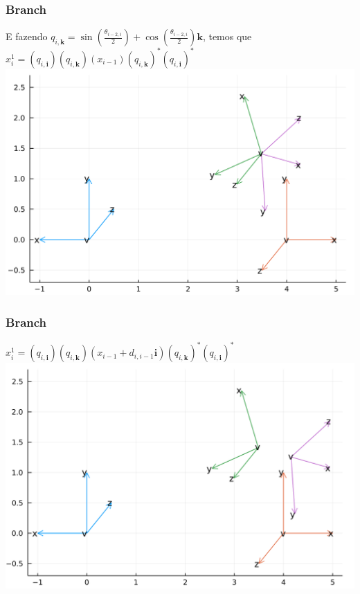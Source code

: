 \documentclass[10pt]{beamer}
\theoremstyle{plain}
\theoremstyle{definition}
\begin{document}
	\begin{frame}
		\frametitle{\normalsize Branch} 
		{
			\begin{center}
				E fazendo $q_{i, \mathbf k} = \sin(\frac {\theta_{i-2, i}} 2) + \cos(\frac {\theta_{i-2, i}} 2)\mathbf k$, temos que\\
				\vspace{0.2cm}
				$x_i^1 = (q_{i,\mathbf i})(q_{i, \mathbf k})(x_{i-1})(q_{i, \mathbf k})^*(q_{i,\mathbf i})^*$
				\\
				
				\vspace{0.5cm}
				\includegraphics[width=0.8\linewidth]{7.png}
			\end{center}
		}	
	\end{frame}

	\begin{frame}
		\frametitle{\normalsize Branch} 
		{
			\begin{center}
				\vspace{0.5cm}
				$x_i^1 = (q_{i,\mathbf i})(q_{i, \mathbf k})(x_{i-1} + d_{i,i-1}\mathbf i)(q_{i, \mathbf k})^*(q_{i,\mathbf i})^*$
				\\
				
				\vspace{0.5cm}
				\includegraphics[width=0.8\linewidth]{8.png}
			\end{center}
		}	
	\end{frame}
	
\end{document}
